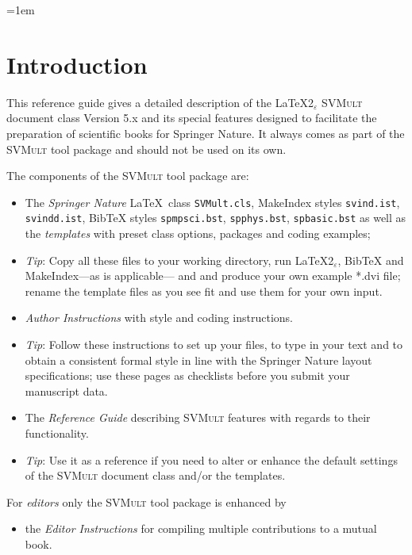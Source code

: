 \documentclass[graybox]{svmult}
\begin{document}
\begin{refguide}

\begin{sloppy}

\parindent=0pt%
\parskip=1em%

\section{Introduction}\label{sec:1}
%
This reference guide gives a detailed description of the \LaTeX2$_{\varepsilon}$ \textsc{SVMult} document class Version 5.x and its special features designed to facilitate the preparation of scientific books for Springer Nature. It always comes as part of the \textsc{SVMult} tool package and should not be used on its own.

\clearpage

The components of the \textsc{SVMult} tool package are:
%
\begin{itemize}
\item The \textit{Springer Nature} \LaTeX~class \verb|SVMult.cls|, MakeIndex styles \texttt{svind.ist}, \texttt{svindd.ist}, BibTeX styles \texttt{spmpsci.bst}, \texttt{spphys.bst}, \texttt{spbasic.bst}{\break} as well as the \textit{templates} with preset class options, packages and coding{\break} examples;
%
\item[]\textit{Tip}: Copy all these files to your working directory, run \LaTeX2$_{\varepsilon}$, BibTeX and MakeIndex---as is applicable--- and and produce your own example *.dvi file; rename the template files as you see fit and use them for your own input.
%
\item \textit{Author Instructions} with style and coding instructions.
%
\item[]\textit{Tip}: Follow these instructions to set up your files, to type in your text and to obtain a consistent formal style in line with the Springer Nature layout specifications; use these pages as checklists before you submit your manuscript data.
%
\item The \textit{Reference Guide} describing \textsc{SVMult} features with regards to their functionality.
%
\item[]\textit{Tip}: Use it as a reference if you need to alter or enhance the default settings of the \textsc{SVMult} document class and/or the templates.
\end{itemize}
%

For \textit{editors} only the \textsc{SVMult} tool package is enhanced by
%
\begin{itemize}
\item the \textit{Editor Instructions} for compiling multiple contributions to a mutual book.
\end{itemize}
%


\end{sloppy}
\end{refguide}
\end{document}

